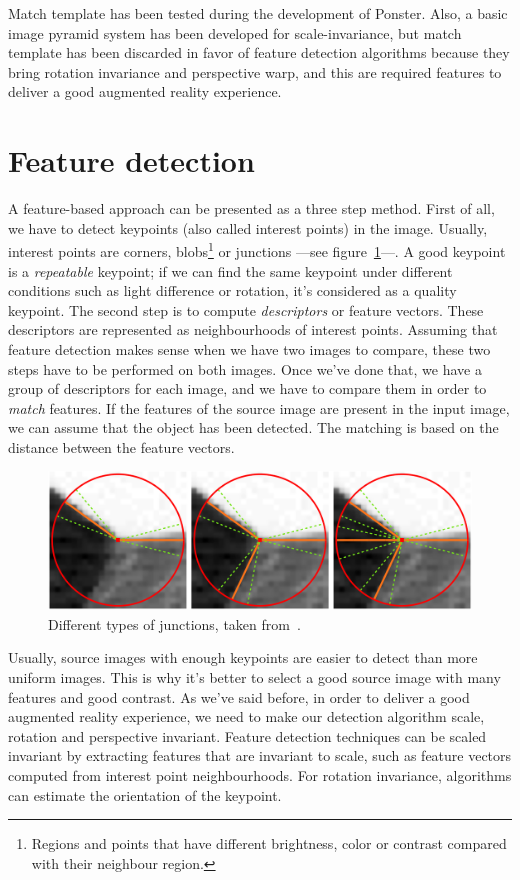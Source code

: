 Match template has been tested during the development of Ponster. Also, a basic
image pyramid system has been developed for scale-invariance, but match template has
been discarded in favor of feature detection algorithms because they bring rotation
 invariance and perspective warp, and this are required features to deliver a
 good augmented reality experience.

\section{Feature detection}
A feature-based approach can be presented as a three step method. First of all, we
have to detect keypoints\cite{feature} (also called interest points) in the image. Usually,
interest points are corners, blobs\footnote{Regions and points that have
  different brightness, color or contrast compared with their neighbour
  region.} or junctions ---see figure~\ref{fig:junctions}---. A good keypoint is a 
\emph{repeatable} keypoint; if we can find the same keypoint under different
conditions such as light difference or rotation, it's considered as a quality
keypoint. The second step is to compute \emph{descriptors} or feature
vectors. These descriptors are represented as neighbourhoods of interest
points. Assuming that feature
detection makes sense when we have two images to compare, these two steps have to be
performed on both images. Once we've done that, we have a group of descriptors for
each image, and we have to compare them in order to \emph{match} features. If the
features of the source image are present in the input image, we can assume that the
object has been detected. The matching is based on the distance between the feature
vectors. 

\begin{figure}
\centering
\includegraphics[scale=0.25]{img/junction.png}
\caption{\label{fig:junctions}Different types of junctions, taken
  from~\cite{junction}.} 
\end{figure} 

Usually, source images with enough keypoints are easier to detect than more
uniform images. This is why it's better to select a good source image with many
features and good contrast. 
As we've said before, in order to deliver a good augmented reality experience,
we need to make our detection algorithm scale, rotation and perspective
invariant. Feature detection techniques can be scaled invariant by extracting
features that are invariant to scale, such as feature vectors computed from
interest point neighbourhoods. For rotation invariance, algorithms can
estimate the orientation of the keypoint. %

